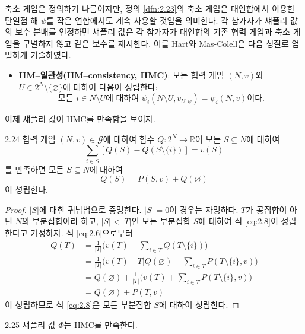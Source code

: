 \documentclass{article}
\numberwithin{equation}{section}
\begin{document}
축소 게임은 정의하기 나름이지만, 정의 \ref{dfn:2.23}의 축소 게임은 대연합에서 이용한 단일점 해 $\psi$를 작은 연합에서도 계속 사용할 것임을 의미한다. 각 참가자가 섀플리 값의 보수 분배를 인정하면 섀플리 값은 각 참가자가 대연합의 기존 협력 게임과 축소 게임을 구별하지 않고 같은 보수를 제시한다. 이를 Hart와 Mas-Colell은 다음 성질로 엄밀하게 기술하였다.
\begin{itemize}
	\item \textbf{HM--일관성(HM--consistency, HMC)}: 모든 협력 게임 $(N,v)$와 $U\in 2^N\setminus\{\varnothing\}$에 대하여 다음이 성립한다:
	\[
		\text{모든 }i\in N\setminus U\text{에 대하여 }\psi_i(N\setminus U,v_{U,\psi})=\psi_i(N,v)\text{이다.}
	\]
\end{itemize}

이제 섀플리 값이 HMC를 만족함을 보이자.

\begin{lemma}{}{2.24}
	협력 게임 $(N,v)\in\mathcal G$에 대하여 함수 $Q:2^N\to\mathbb R$이 모든 $S\subseteq N$에 대하여
	\[
		\sum_{i\in S}[Q(S)-Q(S\setminus\{i\})]=v(S)
	\]
	를 만족하면 모든 $S\subseteq N$에 대하여
	\begin{equation}
		\label{eq:2.8}
		Q(S)=P(S,v)+Q(\varnothing)
	\end{equation}
	이 성립한다.
\end{lemma}

\begin{proof}
	$\vert S\vert$에 대한 귀납법으로 증명한다. $\vert S\vert=0$이 경우는 자명하다. $T$가 공집합이 아닌 $N$의 부분집합이라 하고, $\vert S\vert<\vert T\vert$인 모든 부분집합 $S$에 대하여 식 \ref{eq:2.8}이 성립한다고 가정하자. 식 \ref{eq:2.6}으로부터
	\[
		\begin{aligned}
			Q(T)&=\frac{1}{\vert T\vert}\biggl(v(T)+\sum_{i\in T}Q(T\setminus\{i\})\biggr)\\
			&=\frac{1}{\vert T\vert}\biggl(v(T)+\vert T\vert Q(\varnothing)+\sum_{i\in T}P(T\setminus\{i\},v)\biggr)\\
			&=Q(\varnothing)+\frac{1}{\vert T\vert}\biggl(v(T)+\sum_{i\in T}P(T\setminus\{i\},v)\biggr)\\
			&=Q(\varnothing)+P(T,v)
		\end{aligned}
	\]
	이 성립하므로 식 \ref{eq:2.8}은 모든 부분집합 $S$에 대하여 성립한다.
\end{proof}

\newpage
\begin{thm}{}{2.25}
	섀플리 값 $\Phi$는 HMC를 만족한다.
\end{thm}
\end{document}
